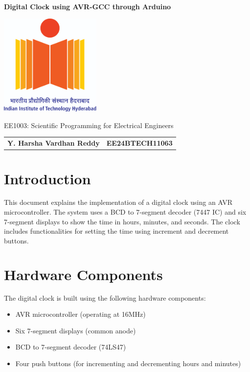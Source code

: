 \documentclass[12pt]{article}
\begin{document}
\begin{titlepage}
    \centering
    {\Large \bfseries  Digital Clock using AVR-GCC through Arduino

 \par}
    \vspace{1cm}
    \includegraphics[width=5cm]{figs/logo.jpg} %
    \vspace{1cm}
   
    
   
    {\large EE1003: Scientific Programming for Electrical Engineers\par}
    \vspace{2cm}
   
\begin{tabular}{ll}
    \textbf{Y. Harsha Vardhan Reddy} & \textbf{EE24BTECH11063} \\
\end{tabular}
\vspace{1cm}
\end{titlepage}

\newpage
\tableofcontents
\newpage
\section{Introduction}
This document explains the implementation of a digital clock using an AVR microcontroller. The system uses a BCD to 7-segment decoder (7447 IC) and six 7-segment displays to show the time in hours, minutes, and seconds. The clock includes functionalities for setting the time using increment and decrement buttons.

\section{Hardware Components}
The digital clock is built using the following hardware components:

\begin{itemize}
    \item AVR microcontroller (operating at 16MHz)
    \item Six 7-segment displays (common anode)
    \item BCD to 7-segment decoder (74LS47)
    \item Four push buttons (for incrementing and decrementing hours and minutes)
\end{itemize}
\end{document}
